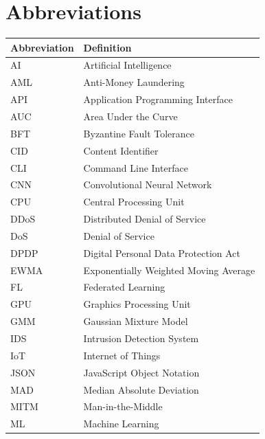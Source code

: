 \documentclass[12pt,a4paper]{report}
\begin{document}
\newpage
\tableofcontents

\newpage
\listoffigures
{}

\newpage
\listoftables
{}

\newpage
\chapter*{Abbreviations}

\begin{table}[H]
\centering
\begin{tabularx}{\textwidth}{lX}
\toprule
\textbf{Abbreviation} & \textbf{Definition} \\
\midrule
AI & Artificial Intelligence \\
AML & Anti-Money Laundering \\
API & Application Programming Interface \\
AUC & Area Under the Curve \\
BFT & Byzantine Fault Tolerance \\
CID & Content Identifier \\
CLI & Command Line Interface \\
CNN & Convolutional Neural Network \\
CPU & Central Processing Unit \\
DDoS & Distributed Denial of Service \\
DoS & Denial of Service \\
DPDP & Digital Personal Data Protection Act \\
EWMA & Exponentially Weighted Moving Average \\
FL & Federated Learning \\
GPU & Graphics Processing Unit \\
GMM & Gaussian Mixture Model \\
IDS & Intrusion Detection System \\
IoT & Internet of Things \\
JSON & JavaScript Object Notation \\
MAD & Median Absolute Deviation \\
MITM & Man-in-the-Middle \\
ML & Machine Learning \\

\end{tabularx}
\end{table}
\end{document}
